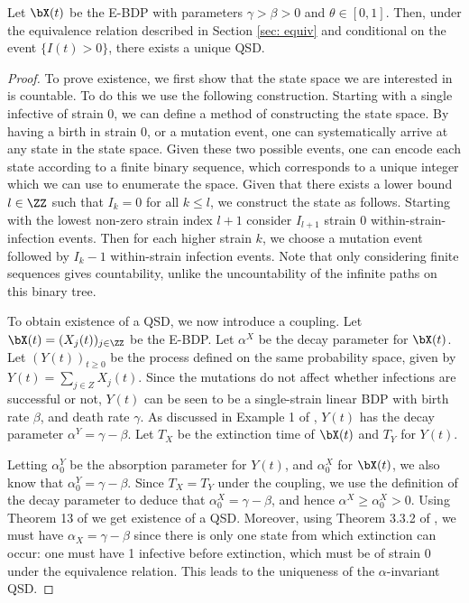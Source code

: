 \documentclass[review]{elsarticle}
\begin{document}
\begin{mythm}\label{thm: eu bdps}
	Let $\bX(t)$ be the E-BDP with parameters $\gamma > \beta > 0$ and $\theta \in [0,1]$. Then, under the equivalence relation described in Section \ref{sec: equiv} and conditional on the event $\{I(t) > 0\}$, there exists a unique QSD.
\end{mythm}
\begin{proof}
	To prove existence, we first show that the state space we are interested in is countable. To do this we use the following construction. Starting with a single infective of strain 0, we can define a method of constructing the state space. By having a birth in strain 0, or a mutation event, one can systematically arrive at any state in the state space. Given these two possible events, one can encode each state according to a finite binary sequence, which corresponds to a unique integer which we can use to enumerate the space. Given that there exists a lower bound $l \in \ZZ$ such that $I_k = 0$ for all $k \leq l$, we construct the state as follows. Starting with the lowest non-zero strain index $l+1$  consider $I_{l+1}$ strain 0 within-strain-infection events. Then for each higher strain $k$, we choose a mutation event followed by $I_k - 1$ within-strain infection events. 
	Note that only considering finite sequences gives countability, unlike the uncountability of the infinite paths on this binary tree.

	To obtain existence of a QSD, we now introduce a coupling. Let $\bX(t) = (X_j(t))_{j \in \ZZ}$ be the E-BDP. Let $\alpha^X$ be the decay parameter for $\bX(t)$. Let $(Y(t))_{t \geq 0}$ be the process defined on the same probability space, given by $Y(t) = \sum_{j \in Z} X_j(t)$. Since the mutations do not affect whether infections are successful or not, $Y(t)$ can be seen to be a single-strain linear BDP with birth rate $\beta$, and death rate $\gamma$. As discussed in Example 1 of \cite{vanDoorn1991}, $Y(t)$ has the decay parameter $\alpha^Y = \gamma - \beta$. Let $T_X$ be the extinction time of $\bX(t)$ and $T_Y$ for $Y(t)$.
	
	Letting $\alpha^Y_0$ be the absorption parameter for $Y(t)$, and $\alpha_0^X$ for $\bX(t)$, we also know that $\alpha_0^Y = \gamma - \beta$. Since $T_X = T_Y$ under the coupling, we use the definition of the decay parameter to deduce that $\alpha_0^X = \gamma - \beta$, and hence $\alpha^X \geq \alpha_0^X > 0$. Using Theorem 13 of \cite{vanDoorn2013} we get existence of a QSD.
	Moreover, using Theorem 3.3.2 of \cite{jacka1995}, we must have $\alpha_X = \gamma - \beta$ since there is only one state from which extinction can occur: one must have 1 infective before extinction, which must be of strain $0$ under the equivalence relation. This leads to the uniqueness of the $\alpha$-invariant QSD.
\end{proof}
\end{document}
